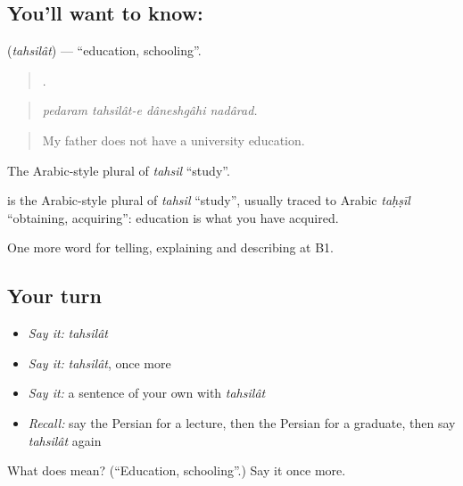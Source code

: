 \subsection*{You'll want to know: }
\textbf{} (\emph{tahsilât}) — \textquotedblleft{}education, schooling\textquotedblright{}.

\begin{quote}
   .
\end{quote}

\begin{quote}
\emph{pedaram tahsilât-e dâneshgâhi nadârad.}
\end{quote}

\begin{quote}
My father does not have a university education.
\end{quote}

The Arabic-style plural of \emph{tahsil} \textquotedblleft{}study\textquotedblright{}.

\begin{cousinweb}
\textbf{} is the Arabic-style plural of \emph{tahsil} \textquotedblleft{}study\textquotedblright{}, usually traced to Arabic \emph{taḥṣīl} \textquotedblleft{}obtaining, acquiring\textquotedblright{}: education is what you have acquired.
\end{cousinweb}

\begin{grammarlens}[title={What you've built}]
One more word for telling, explaining and describing at B1.
\end{grammarlens}

\subsection*{Your turn}
\begin{itemize}
\raggedright
  \item \emph{Say it:} \emph{tahsilât}
  \item \emph{Say it:} \emph{tahsilât}, once more
  \item \emph{Say it:} a sentence of your own with \emph{tahsilât}
  \item \emph{Recall:} say the Persian for a lecture, then the Persian for a graduate, then say \emph{tahsilât} again
\end{itemize}

\begin{tcolorbox}[breakable,colback=teal!4,colframe=teal!35!black,title={Before you move on}]
What does  mean? (\textquotedblleft{}Education, schooling\textquotedblright{}.) Say it once more.
\end{tcolorbox}
